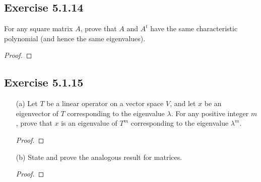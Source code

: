\subsection*{Exercise 5.1.14} For any square matrix \( A  \), prove that \( A  \) and \( A^{t} \) have the same characteristic polynomial (and hence the same eigenvalues).
\begin{proof}

\end{proof}

\subsection*{Exercise 5.1.15} 
\begin{enumerate}
    \item[(a)] Let \( T  \) be a linear operator on a vector space \( V  \), and let \( x  \) be an eigenvector of \( T  \) corresponding to the eigenvalue \( \lambda  \). For any positive integer \( m  \), prove that \( x  \) is an eigenvalue of \( T^{m} \) corresponding to the eigenvalue \( \lambda^{m} \).
        \begin{proof}
            
        \end{proof}
    \item[(b)] State and prove the analogous result for matrices.
        \begin{proof}
        
        \end{proof}
\end{enumerate}

